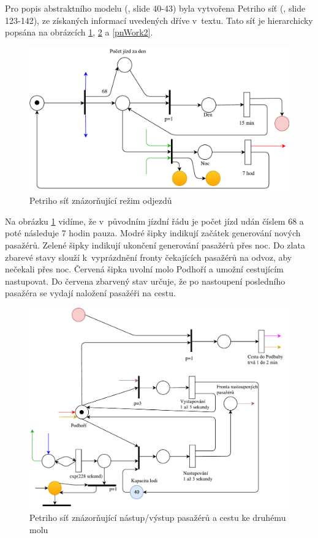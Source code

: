 \documentclass[11pt,a4paper]{article}
\begin{document}
  Pro popis abstraktního modelu (\cite{SLAJD}, slide 40-43) byla vytvořena Petriho síť (\cite{SLAJD}, slide 123-142),
  ze získaných informací uvedených dříve v~textu. Tato síť je hierarchicky popsána na obrázcích \ref{pnTime}, \ref{pnWork} a \ref{pnWork2}.

	\begin{figure}[ht]
		\centering
		\includegraphics[scale=0.7]{pn-daytime.pdf}
		\caption{Petriho síť znázorňující režim odjezdů}
		\label{pnTime}
	\end{figure}

	Na obrázku \ref{pnTime} vidíme, že v~původním jízdní řádu je počet jízd udán číslem 68 a
	poté následuje 7 hodin pauza. Modré šipky indikují začátek generování nových pasažérů.
	Zelené šipky indikují ukončení generování pasažérů přes noc. Do zlata zbarevé stavy
	slouží k~vyprázdnění fronty čekajících pasažérů na odvoz, aby nečekali přes noc.
	Červená šipka uvolní molo Podhoří a umožní cestujícím nastupovat. Do červena zbarvený
	stav určuje, že po nastoupení posledního pasažéra se vydají naložení pasažéři na cestu.

	\begin{figure}[ht]
		\centering
		\includegraphics[scale=0.7]{pn-work.pdf}
		\caption{Petriho síť znázorňující nástup/výstup pasažérů a cestu ke druhému molu}
		\label{pnWork}
	\end{figure}
\end{document}
